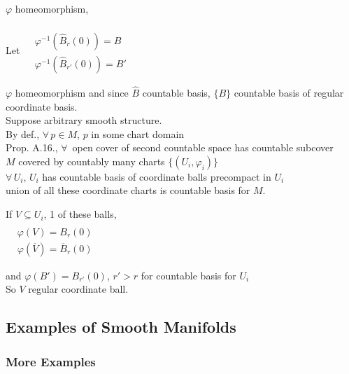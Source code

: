 $\varphi$ homeomorphism, 

\quad Let $\begin{aligned}
  & \quad \\
  & \varphi^{-1}( \widehat{B}_r{(0)}) = B \\
  & \varphi^{-1}{(\widehat{B}_{r'}{(0)} )} = B' \end{aligned}$

$\varphi$ homeomorphism and since $\widehat{B}$ countable basis, $\lbrace B \rbrace$ countable basis of regular coordinate basis. \\

Suppose arbitrary smooth structure.  \\
\quad By def., $\forall \, p \in M$, $p$ in some chart domain \\
\quad Prop. A.16., $\forall \, $ open cover of second countable space has countable subcover \\
\quad $M$ covered by countably many charts $\lbrace (U_i, \varphi_i) \rbrace$ \\

$\forall \, U_i , \, U_i$ has countable basis of coordinate balls precompact in $U_i$ \\
union of all these coordinate charts is countable basis for $M$.  

If $V \subseteq U_i$, 1 of these balls,  \\
$\begin{aligned}
  & \quad \\ 
  & \varphi(V) = B_r(0) \\ 
  & \varphi{(\overline{V})} = \overline{B}_r(0)
\end{aligned}$

and $\varphi(B') = B_{r'}{(0)}$, $r' > r$ for countable basis for $U_i$ \\
So $V$ regular coordinate ball.


\hrulefill



\subsection*{Examples of Smooth Manifolds}






\subsubsection*{More Examples}



